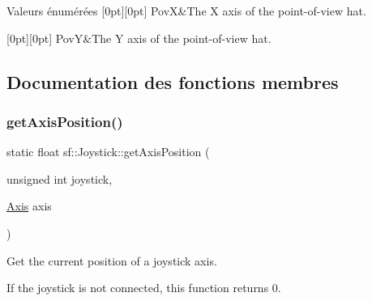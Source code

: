 \begin{DoxyEnumFields}{Valeurs énumérées}
[0pt][0pt]{}\mbox{\label{classsf_1_1Joystick_a48db337092c2e263774f94de6d50baa7a06420f7714e4dfd8b841885a0b5f3954}} 
PovX&The X axis of the point-\/of-\/view hat. \\
\hline

[0pt][0pt]{}\mbox{\label{classsf_1_1Joystick_a48db337092c2e263774f94de6d50baa7a0f8ffb2dcddf91b98ab910a4f8327ad9}} 
PovY&The Y axis of the point-\/of-\/view hat. \\
\hline

\end{DoxyEnumFields}


\subsection{Documentation des fonctions membres}
\mbox{\label{classsf_1_1Joystick_aea4930193331df1851b709f3060ba58b}} 
\subsubsection{\texorpdfstring{get\+Axis\+Position()}{getAxisPosition()}}
{\footnotesize\ttfamily static float sf\+::\+Joystick\+::get\+Axis\+Position (\begin{DoxyParamCaption}\item[{unsigned int}]{joystick,  }\item[{\hyperlink{classsf_1_1Joystick_a48db337092c2e263774f94de6d50baa7}{Axis}}]{axis }\end{DoxyParamCaption})\hspace{0.3cm}{\ttfamily [static]}}



Get the current position of a joystick axis. 

If the joystick is not connected, this function returns 0.


